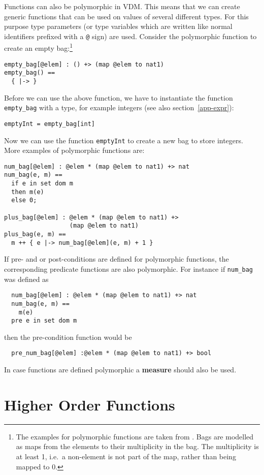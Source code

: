 \documentclass{overturerepchap}
\newcommand{\keyw}[1]{{\bf\ttfamily #1}}
\begin{document}
Functions can also be polymorphic in VDM. This means that we can create
generic functions that can be used on values of several different
types. For this purpose type parameters (or type variables which are
written like normal identifiers prefixed with a {\tt @} sign) are
used. Consider the polymorphic function to create an empty
bag:\footnote{The examples for polymorphic functions are taken from
\cite{Dawes91}. Bags are modelled as maps from the elements to their
multiplicity in the bag. The multiplicity is at least 1, i.e.\ a
non-element is not part of the map, rather than being mapped to 0.}
\begin{lstlisting}
empty_bag[@elem] : () +> (map @elem to nat1)
empty_bag() ==
  { |-> }
\end{lstlisting}
Before we can use the above function, we have to instantiate the
function {\tt empty\_bag} with a type, for example integers (see also
section~\ref{app-expr}):
\begin{lstlisting}
emptyInt = empty_bag[int]
\end{lstlisting}
Now we can use the function {\tt emptyInt} to create a new bag to store
integers. More examples of polymorphic functions are:
\begin{lstlisting}
num_bag[@elem] : @elem * (map @elem to nat1) +> nat
num_bag(e, m) ==
  if e in set dom m
  then m(e)
  else 0;

plus_bag[@elem] : @elem * (map @elem to nat1) +> 
                  (map @elem to nat1)
plus_bag(e, m) ==
  m ++ { e |-> num_bag[@elem](e, m) + 1 }
\end{lstlisting} 
If pre- and or post-conditions are defined for polymorphic functions, the
corresponding predicate functions are also polymorphic. For instance
if \texttt{num\_bag} was defined as
\begin{lstlisting}
  num_bag[@elem] : @elem * (map @elem to nat1) +> nat
  num_bag(e, m) ==
    m(e)
  pre e in set dom m
\end{lstlisting}
then the pre-condition function would be
\begin{lstlisting}
  pre_num_bag[@elem] :@elem * (map @elem to nat1) +> bool
\end{lstlisting}

In case functions are defined polymorphic a \keyw{measure} should also be
used.

\section{Higher Order Functions}
\end{document}
